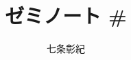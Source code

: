 \documentclass[a4paper, dvipdfmx]{jsarticle}
\begin{document}
\title{ゼミノート \#}
\author{七条彰紀}
\maketitle
\tableofcontents
\vspace{10pt}



\end{document}
